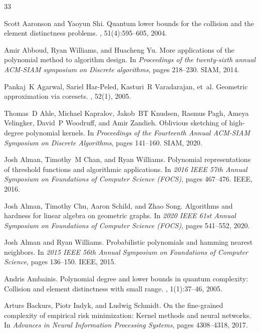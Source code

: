 \documentclass[10pt,a4paper]{article}
\theoremstyle{plain}\newtheorem{theorem}{Theorem}
\theoremstyle{definition}
\begin{document}
\begin{thebibliography}{33}

Scott Aaronson and Yaoyun Shi.
\newblock Quantum lower bounds for the collision and the element distinctness
  problems.
, 51(4):595--605, 2004.

Amir Abboud, Ryan Williams, and Huacheng Yu.
\newblock More applications of the polynomial method to algorithm design.
\newblock In {\em Proceedings of the twenty-sixth annual ACM-SIAM symposium on
  Discrete algorithms}, pages 218--230. SIAM, 2014.

Pankaj~K Agarwal, Sariel Har-Peled, Kasturi~R Varadarajan, et~al.
\newblock Geometric approximation via coresets.
, 52(1), 2005.

Thomas~D Ahle, Michael Kapralov, Jakob~BT Knudsen, Rasmus Pagh, Ameya
  Velingker, David~P Woodruff, and Amir Zandieh.
\newblock Oblivious sketching of high-degree polynomial kernels.
\newblock In {\em Proceedings of the Fourteenth Annual ACM-SIAM Symposium on
  Discrete Algorithms}, pages 141--160. SIAM, 2020.

Josh Alman, Timothy~M Chan, and Ryan Williams.
\newblock Polynomial representations of threshold functions and algorithmic
  applications.
\newblock In {\em 2016 IEEE 57th Annual Symposium on Foundations of Computer
  Science (FOCS)}, pages 467--476. IEEE, 2016.

Josh Alman, Timothy Chu, Aaron Schild, and Zhao Song.
\newblock Algorithms and hardness for linear algebra on geometric graphs.
\newblock In {\em 2020 IEEE 61st Annual Symposium on Foundations of Computer
  Science (FOCS)}, pages 541--552, 2020.

Josh Alman and Ryan Williams.
\newblock Probabilistic polynomials and hamming nearest neighbors.
\newblock In {\em 2015 IEEE 56th Annual Symposium on Foundations of Computer
  Science}, pages 136--150. IEEE, 2015.

Andris Ambainis.
\newblock Polynomial degree and lower bounds in quantum complexity: Collision
  and element distinctness with small range.
, 1(1):37--46, 2005.

Arturs Backurs, Piotr Indyk, and Ludwig Schmidt.
\newblock On the fine-grained complexity of empirical risk minimization: Kernel
  methods and neural networks.
\newblock In {\em Advances in Neural Information Processing Systems}, pages
  4308--4318, 2017.


\end{thebibliography}
\end{document}
